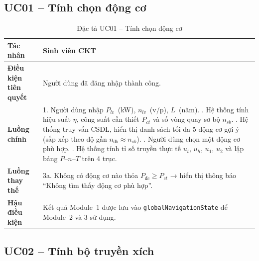 \subsection{UC01 -- Tính chọn động cơ}

\begin{table}[H]
\centering
\caption{Đặc tả UC01 -- Tính chọn động cơ}
\label{tab:uc01}
\begin{tabularx}{\textwidth}{|l|X|}
\hline
\textbf{Tác nhân} & Sinh viên CKT \\
\hline
\textbf{Điều kiện tiên quyết} & Người dùng đã đăng nhập thành công. \\
\hline
\textbf{Luồng chính} &
  1. Người dùng nhập $P_{lv}$~(kW), $n_{lv}$~(v/p), $L$~(năm). \newline
  2. Hệ thống tính hiệu suất $\eta$, công suất cần thiết $P_{ct}$ và số vòng quay sơ bộ $n_{sb}$. \newline
  3. Hệ thống truy vấn CSDL, hiển thị danh sách tối đa 5 động cơ gợi ý (sắp xếp theo độ gần $n_{đb} \approx n_{sb}$). \newline
  4. Người dùng chọn một động cơ phù hợp. \newline
  5. Hệ thống tính tỉ số truyền thực tế $u_t$, $u_h$, $u_1$, $u_2$ và lập bảng $P$--$n$--$T$ trên 4 trục. \\
\hline
\textbf{Luồng thay thế} &
  3a. Không có động cơ nào thỏa $P_{đc} \geq P_{ct}$ → hiển thị thông báo ``Không tìm thấy động cơ phù hợp''. \\
\hline
\textbf{Hậu điều kiện} &
  Kết quả Module~1 được lưu vào \texttt{globalNavigationState} để Module~2 và 3 sử dụng. \\
\hline
\end{tabularx}
\end{table}

\subsection{UC02 -- Tính bộ truyền xích}

